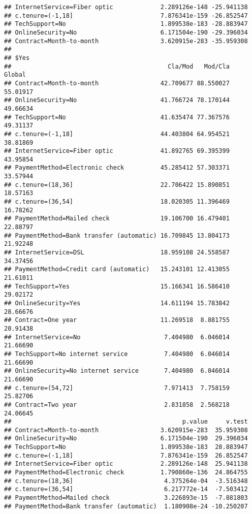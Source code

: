 \documentclass[
]{article}
\begin{document}
\begin{verbatim}
## InternetService=Fiber optic             2.289126e-148 -25.941138
## c.tenure=(-1,18]                        7.876341e-159 -26.852547
## TechSupport=No                          1.899538e-183 -28.883947
## OnlineSecurity=No                       6.171504e-190 -29.396034
## Contract=Month-to-month                 3.620915e-283 -35.959308
## 
## $Yes
##                                           Cla/Mod   Mod/Cla   Global
## Contract=Month-to-month                 42.709677 88.550027 55.01917
## OnlineSecurity=No                       41.766724 78.170144 49.66634
## TechSupport=No                          41.635474 77.367576 49.31137
## c.tenure=(-1,18]                        44.403804 64.954521 38.81869
## InternetService=Fiber optic             41.892765 69.395399 43.95854
## PaymentMethod=Electronic check          45.285412 57.303371 33.57944
## c.tenure=(18,36]                        22.706422 15.890851 18.57163
## c.tenure=(36,54]                        18.020305 11.396469 16.78262
## PaymentMethod=Mailed check              19.106700 16.479401 22.88797
## PaymentMethod=Bank transfer (automatic) 16.709845 13.804173 21.92248
## InternetService=DSL                     18.959108 24.558587 34.37456
## PaymentMethod=Credit card (automatic)   15.243101 12.413055 21.61011
## TechSupport=Yes                         15.166341 16.586410 29.02172
## OnlineSecurity=Yes                      14.611194 15.783842 28.66676
## Contract=One year                       11.269518  8.881755 20.91438
## InternetService=No                       7.404980  6.046014 21.66690
## TechSupport=No internet service          7.404980  6.046014 21.66690
## OnlineSecurity=No internet service       7.404980  6.046014 21.66690
## c.tenure=(54,72]                         7.971413  7.758159 25.82706
## Contract=Two year                        2.831858  2.568218 24.06645
##                                               p.value     v.test
## Contract=Month-to-month                 3.620915e-283  35.959308
## OnlineSecurity=No                       6.171504e-190  29.396034
## TechSupport=No                          1.899538e-183  28.883947
## c.tenure=(-1,18]                        7.876341e-159  26.852547
## InternetService=Fiber optic             2.289126e-148  25.941138
## PaymentMethod=Electronic check          1.790860e-136  24.864755
## c.tenure=(18,36]                         4.375264e-04  -3.516348
## c.tenure=(36,54]                         6.217772e-14  -7.503412
## PaymentMethod=Mailed check               3.226893e-15  -7.881803
## PaymentMethod=Bank transfer (automatic)  1.180908e-24 -10.250207

\end{verbatim}
\end{document}
